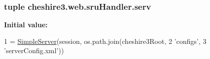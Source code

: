 \hypertarget{namespacecheshire3_1_1web_1_1sru_handler_a9fcf8788ca6e01597fe3b58b10f1135b}{
\subsubsection[{serv}]{\setlength{\rightskip}{0pt plus 5cm}tuple cheshire3.\-web.\-sru\-Handler.\-serv}}\label{namespacecheshire3_1_1web_1_1sru_handler_a9fcf8788ca6e01597fe3b58b10f1135b}
{\bfseries Initial value\-:}
\begin{DoxyCode}
1 = \hyperlink{classcheshire3_1_1server_1_1_simple_server}{SimpleServer}(session, os.path.join(cheshire3Root,
2                                           \textcolor{stringliteral}{'configs'},
3                                           \textcolor{stringliteral}{'serverConfig.xml'}))
\end{DoxyCode}
